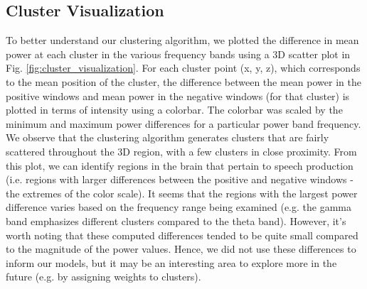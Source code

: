 \documentclass[format=sigconf, nonacm=true, review=false, screen=true]{acmart}
\begin{document}
\subsection{Cluster Visualization}
To better understand our clustering algorithm, we plotted the difference in mean power at each cluster in the various frequency bands using a 3D scatter plot in Fig. \ref{fig:cluster_visualization}. For each cluster point (x, y, z), which corresponds to the mean position of the cluster, the difference between the mean  power in the positive windows and mean power in the negative windows (for that cluster) is plotted in terms of intensity using a colorbar. The colorbar was scaled by the minimum and maximum power differences for a particular power band frequency. We observe that the clustering algorithm generates clusters that are fairly scattered throughout the 3D region, with a few clusters in close proximity. From this plot, we can identify regions in the brain that pertain to speech production (i.e. regions with larger differences between the positive and negative windows - the extremes of the color scale). It seems that the regions with the largest power difference varies based on the frequency range being examined (e.g. the gamma band emphasizes different clusters compared to the theta band). However, it's worth noting that these computed differences tended to be quite small compared to the magnitude of the power values. Hence, we did not use these differences to inform our models, but it may be an interesting area to explore more in the future (e.g. by assigning weights to clusters).
\end{document}
